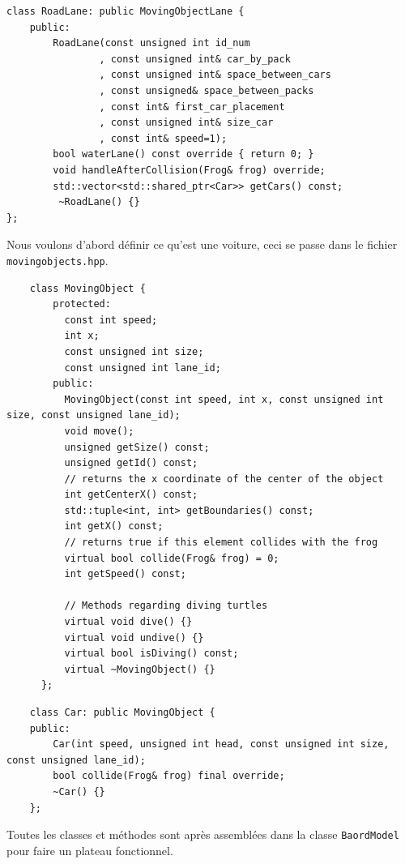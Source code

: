 \documentclass[a4paper, 12pt]{article}
\begin{document}
\begin{lstlisting}
class RoadLane: public MovingObjectLane {
    public:
        RoadLane(const unsigned int id_num
                , const unsigned int& car_by_pack
                , const unsigned int& space_between_cars
                , const unsigned& space_between_packs
                , const int& first_car_placement
                , const unsigned int& size_car
                , const int& speed=1);
        bool waterLane() const override { return 0; }
        void handleAfterCollision(Frog& frog) override;
        std::vector<std::shared_ptr<Car>> getCars() const;
         ~RoadLane() {}
};
\end{lstlisting}

Nous voulons d'abord définir ce qu'est une voiture, ceci se passe dans le fichier \texttt{movingobjects.hpp}. \\

\begin{lstlisting}
    class MovingObject {
        protected:
          const int speed;
          int x;
          const unsigned int size;
          const unsigned int lane_id;
        public:
          MovingObject(const int speed, int x, const unsigned int size, const unsigned lane_id);
          void move();
          unsigned getSize() const;
          unsigned getId() const;
          // returns the x coordinate of the center of the object
          int getCenterX() const;
          std::tuple<int, int> getBoundaries() const;
          int getX() const;
          // returns true if this element collides with the frog
          virtual bool collide(Frog& frog) = 0;
          int getSpeed() const;
      
          // Methods regarding diving turtles
          virtual void dive() {}
          virtual void undive() {}
          virtual bool isDiving() const;
          virtual ~MovingObject() {}
      };
\end{lstlisting}

\begin{lstlisting}
    class Car: public MovingObject {
    public:
        Car(int speed, unsigned int head, const unsigned int size, const unsigned lane_id);
        bool collide(Frog& frog) final override;
        ~Car() {}
    };
\end{lstlisting}

Toutes les classes et méthodes sont après assemblées dans la classe \texttt{BaordModel} pour faire un plateau fonctionnel. \\
\end{document}
